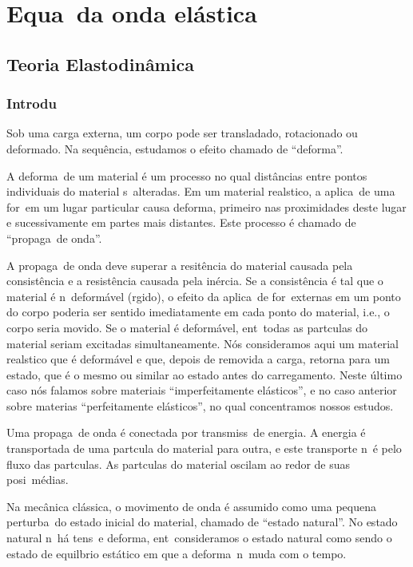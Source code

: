 \chapter{Equa\cao\ da onda el\'astica}

\section{Teoria Elastodin\^amica}

\subsection{Introdu\cao}

Sob uma carga externa, um corpo pode ser transladado,
rotacionado ou deformado. Na sequ\^encia, estudamos
o efeito chamado de ``deforma\cao''.

A deforma\cao\ de um material \'e um processo no qual
dist\^ancias entre pontos individuais do material s\ao\
alteradas. Em um material real\ih stico, a aplica\cao\
de uma for\ca\ em um lugar particular causa deforma\coes,
primeiro nas proximidades deste lugar e sucessivamente em
partes mais distantes. Este processo \'e chamado de
``propaga\cao\ de onda''.

A propaga\cao\ de onda deve superar a resit\^encia do
material causada pela consist\^encia e a resist\^encia
causada pela in\'ercia. Se a consist\^encia \'e tal que o
material \'e n\ao\ deform\'avel (r\ih gido), o efeito da
aplica\cao\ de for\cas\ externas em um ponto do corpo
poderia ser sentido imediatamente em cada ponto do
material, i.e., o corpo seria movido. Se o material \'e
deform\'avel, ent\ao\ todas as part\ih culas do material
seriam excitadas simultaneamente. N\'os consideramos aqui
um material real\ih stico que \'e deform\'avel e que,
depois de removida a carga, retorna para um estado, que
\'e o mesmo ou similar ao estado antes do carregamento.
Neste \'ultimo caso n\'os falamos sobre materiais
``imperfeitamente el\'asticos'', e no caso anterior sobre
materias ``perfeitamente el\'asticos'', no qual
concentramos nossos estudos.

Uma propaga\cao\ de onda \'e conectada por transmiss\ao\
de energia. A energia \'e transportada de uma part\ih cula
do material para outra, e este transporte n\ao\ \'e pelo
fluxo das part\ih culas. As part\ih culas do material
oscilam ao redor de suas posi\coes\ m\'edias.

Na mec\^anica cl\'assica, o movimento de onda \'e assumido
como uma pequena perturba\cao\ do estado inicial do material,
chamado de ``estado natural''. No estado natural n\ao\ h\'a
tens\oes\ e deforma\coes, ent\ao\ consideramos o estado
natural como sendo o estado de equil\ih brio est\'atico em que a
deforma\cao\ n\ao\ muda com o tempo.

